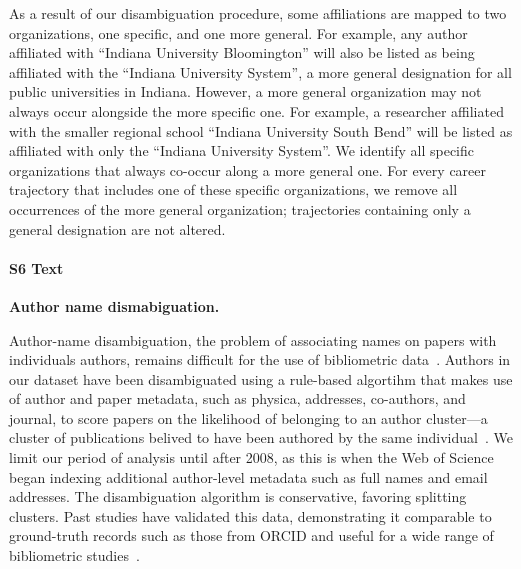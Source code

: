 \documentclass[12pt]{article} %
\begin{document}
As a result of our disambiguation procedure, some affiliations are mapped to two organizations, one specific, and one more general.
For example, any author affiliated with ``Indiana University Bloomington'' will also be listed as being affiliated with the ``Indiana University System'', a more general designation for all public universities in Indiana.
However, a more general organization may not always occur alongside the more specific one.
For example, a researcher affiliated with the smaller regional school ``Indiana University South Bend'' will be listed as affiliated with only the ``Indiana University System''.
We identify all specific organizations that always co-occur along a more general one.
For every career trajectory that includes one of these specific organizations, we remove all occurrences of the more general organization;
trajectories containing only a general designation are not altered.


%
\paragraph*{S6 Text}
\label{si:text:disambiguation}
{\bf Author name dismabiguation.}

Author-name disambiguation, the problem of associating names on papers with individuals authors, remains difficult for the use of bibliometric data~\autocite{dangelo2020disambiguation}. 
Authors in our dataset have been disambiguated using a rule-based algortihm that makes use of author and paper metadata, such as physica, addresses, co-authors, and journal, to score papers on the likelihood of belonging to an author cluster—a cluster of publications belived to have been authored by the same individual~\autocite{caron2014disambiguation}. 
We limit our period of analysis until after 2008, as this is when the Web of Science began indexing additional author-level metadata such as full names and email addresses. 
The disambiguation algorithm is conservative, favoring splitting clusters. 
Past studies have validated this data, demonstrating it comparable to ground-truth records such as those from ORCID and useful for a wide range of bibliometric studies~\cite{sugimoto2017mostimpact, robinson2019mobility, chinchilla2018global, chinchilla2018travelban}.


\newpage
\end{document}

